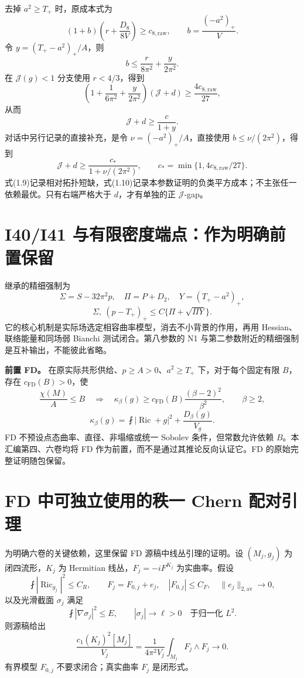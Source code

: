 \documentclass[UTF8,11pt,openany,fontset=none]{ctexbook}
\theoremstyle{definition}
\theoremstyle{remark}
\begin{document}
去掉 \(a^2\ge T_+\) 时，原成本式为 \[
 (1+b)\left(r+\frac{D_8}{8V}\right)\ge c_{8,\mathrm{raw}},
 \qquad b=\frac{(-a^2)_+}{V}.
\] 令 \(y=(T_+-a^2)_+/A\)，则 \[
 b\le\frac r{8\pi^2}+\frac y{2\pi^2}.
\] 在 \(\mathcal J(g)<1\) 分支使用 \(r<4/3\)，得到 \[
 \left(1+\frac1{6\pi^2}+\frac y{2\pi^2}\right)(\mathcal J+d)
 \ge\frac{4c_{8,\mathrm{raw}}}{27},
\] 从而 \[
 \boxed{\mathcal J+d\ge\frac{c}{1+y}.}
\tag{1.9}
\] 对话中另行记录的直接补充，是令 \(\nu=(-a^2)_+/A\)，直接使用 \(b\le\nu/(2\pi^2)\)，得到 \[
 \boxed{\mathcal J+d\ge
 \frac{c_*}{1+\nu/(2\pi^2)},\qquad
 c_*=\min\{1,4c_{8,\mathrm{raw}}/27\}.}
\tag{1.10}
\] 式(1.9)记录相对拓扑短缺，式(1.10)记录本参数证明的负类平方成本；不主张任一依赖最优。只有右端严格大于 \(d\)，才有单独的正 \(\mathcal J\)-gap。

\section{I40/I41 与有限密度端点：作为明确前置保留}\label{v1-i40i41-ux4e0eux6709ux9650ux5bc6ux5ea6ux7aefux70b9ux4f5cux4e3aux660eux786eux524dux7f6eux4fddux7559}

继承的精细强制为 \[
 \Sigma=S-32\pi^2p,\quad \Pi=P+D_2,\quad Y=(T_+-a^2)_+,
\] \[
 \boxed{\Sigma,\ (p-T_+)_+\le C\{\Pi+\sqrt{\Pi Y}\}.}
\tag{1.11}
\] 它的核心机制是实际场选定相容曲率模型，消去不小背景的作用，再用 Hessian、联络能量和同场弱 Bianchi 测试闭合。第八参数的 N1 与第二参数附近的精细强制是互补输出，不能彼此省略。\cite{I01,B01}

\textbf{前置 FD。} 在原实际共形供给、\(p\ge A>0\)、\(a^2\ge T_+\) 下，对于每个固定有限 \(B\)，存在 \(c_{\mathrm{FD}}(B)>0\)，使 \[
 \frac{\chi(M)}A\le B\quad\Longrightarrow\quad
 \boxed{\kappa_\beta(g)\ge c_{\mathrm{FD}}(B)
 \frac{(\beta-2)^2}{\beta^2}},\qquad\beta\ge2,
\tag{1.12}
\] \[
 \kappa_\beta(g)=\fint|\operatorname{Ric}+g|^2+\frac{D_\beta(g)}{V_g}.
\] FD 不预设点态曲率、直径、非塌缩或统一 Sobolev 条件，但常数允许依赖 \(B\)。本汇编第四、六卷均将 FD 作为前置，而不是通过其推论反向认证它。FD 的原始完整证明随包保留。\cite{I02}

\section{FD 中可独立使用的秩一 Chern 配对引理}\label{v1-fd-ux4e2dux53efux72ecux7acbux4f7fux7528ux7684ux79e9ux4e00-chern-ux914dux5bf9ux5f15ux7406}

为明确六卷的关键依赖，这里保留 FD 源稿中线丛引理的证明。设 \((M_j,g_j)\) 为闭四流形，\(K_j\) 为 Hermitian 线丛，\(F_j=-iF^{K_j}\) 为实曲率。假设 \[
 \fint|\operatorname{Ric}_{g_j}|^2\le C_R,\qquad
 F_j=F_{0,j}+e_j,\quad |F_{0,j}|\le C_F,\quad\|e_j\|_{2,\mathrm{av}}\to0,
\] 以及光滑截面 \(\sigma_j\) 满足 \[
 \fint|\nabla\sigma_j|^2\le E,
 \qquad |\sigma_j|\to\ell>0\quad\text{于归一化 }L^2.
\] 则源稿给出 \[
 \boxed{\frac{c_1(K_j)^2[M_j]}{V_j}
 =\frac1{4\pi^2V_j}\int_{M_j}F_j\wedge F_j\to0.}
\tag{1.13}
\] 有界模型 \(F_{0,j}\) 不要求闭合；真实曲率 \(F_j\) 是闭形式。
\end{document}
